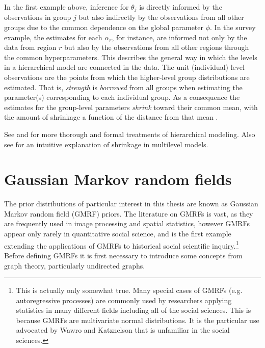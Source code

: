 In the first example above, inference for $\theta_j$ is directly informed by the observations in
group $j$ but also indirectly by the observations from all other groups due to the common dependence
on the global parameter $\phi$. In the survey example, the 
estimates for each $\alpha_r$, for instance, are informed not only by the data from region $r$ but 
also by the observations from all other regions through the common hyperparameters. This describes
the general way in which the levels in a hierarchical model are connected in the data. The unit (individual) level 
observations are the points from which the higher-level group distributions are estimated. That is, {\it strength} is 
{\it borrowed} from all groups when estimating the parameter(s) corresponding to each individual group. As a 
consequence the estimates for the group-level parameters {\it shrink} toward their common mean, 
with the amount of shrinkage a function of the distance from that mean 
.

See  and  for more 
thorough and formal treatments of hierarchical modeling. Also see  
for an intuitive explanation of shrinkage in multilevel models.



\section{Gaussian Markov random fields}
\label{gmrf}

The prior distributions of particular interest in this thesis are known as Gaussian Markov random 
field (GMRF) priors. The literature on GMRFs is vast, as they are frequently used in image processing 
and spatial statistics, however GMRFs appear only rarely in quantitative social science, and 
 is the first example extending the applications of GMRFs to historical 
social scientific inquiry.\footnote{This is actually only somewhat true. Many special cases of GMRFs  
(e.g. autoregressive processes) are commonly used by researchers applying statistics in many different 
fields including all of the social sciences. This is because GMRFs are  multivariate normal distributions. 
It is the particular use advocated by Wawro and Katznelson that is unfamiliar in the social sciences.} 
Before defining GMRFs it is first necessary to introduce some concepts from graph theory, particularly undirected graphs. 

